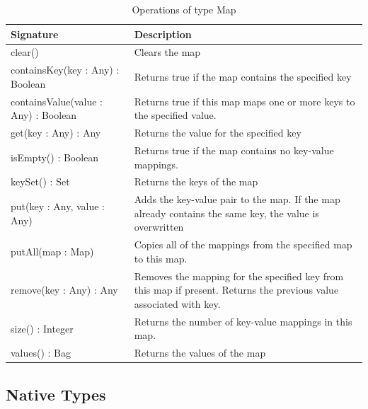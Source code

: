 \begin{longtabu} {|p{6.5cm}|X|}
\caption{Operations of type Map}
\label{tab:MapOperations}\\
\hline

    \textbf{Signature} & \textbf{Description} \\\hline

    clear() & Clears the map\\\hline
    
    containsKey(key : Any) : Boolean & Returns true if the map contains the specified key\\\hline
    
    containsValue(value : Any) : Boolean &  Returns true if this map maps one or more keys to the specified value.\\\hline
    
    get(key : Any) : Any & Returns the value for the specified key\\\hline

    isEmpty() : Boolean & Returns true if the map contains no key-value mappings.\\\hline
    
    keySet() : Set & Returns the keys of the map\\\hline
    
    put(key : Any, value : Any) & Adds the key-value pair to the map. If the map already contains the same key, the value is overwritten\\\hline
    
    putAll(map : Map) & Copies all of the mappings from the specified map to this map.\\\hline
    
    remove(key : Any) : Any & Removes the mapping for the specified key from this map if present. Returns the previous value associated with key.\\\hline
    
    size() : Integer &  Returns the number of key-value mappings in this map.\\\hline
    
    values() : Bag & Returns the values of the map\\\hline
\end{longtabu}

\subsection{Native Types}

